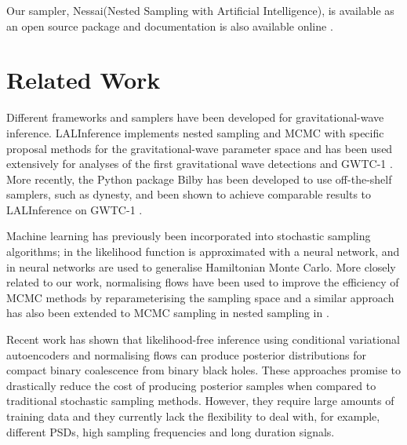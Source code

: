 \documentclass[%
 reprint,
nofootinbib,
 amsmath,amssymb,
 aps,
 prd,
]{revtex4-2}
\newcommand{\nessai}{{\sc Nessai}\xspace}
\newcommand{\bilby}{{\sc Bilby}\xspace}
\newcommand{\lalinference}{{\sc LALInference}\xspace}
\newcommand{\dynesty}{{\sc dynesty}\xspace}
\newcommand{\python}{{\sc Python}\xspace}
\begin{document}
Our sampler, \nessai (Nested Sampling with Artificial Intelligence), is available as an open source package \cite{nessai-git} and documentation is also available online \cite{nessai-docs}.


\section{Related Work} \label{sec:related_work}

Different frameworks and samplers have been developed for gravitational-wave inference. \lalinference \cite{Veitch:2015} implements nested sampling and \ac{MCMC} with specific proposal methods for the gravitational-wave parameter space and has been used extensively for analyses of the first gravitational wave detections \cite{Abbott:2016blz} and GWTC-1 \cite{LIGOScientific:2018mvr}. More recently, the \python package \bilby \cite{Ashton:2019} has been developed to use off-the-shelf samplers, such as \dynesty \cite{Speagle:2020}, and been shown to achieve comparable results to \lalinference on GWTC-1 \cite{Romero-Shaw:2020}.

Machine learning has previously been incorporated into stochastic sampling algorithms; in \cite{Graff:2013bambi} the likelihood function is approximated with a neural network, and in \cite{Levy:2017ghmc} neural networks are used to generalise Hamiltonian Monte Carlo. More closely related to our work, normalising flows have been used to improve the efficiency of \ac{MCMC} methods by reparameterising the sampling space \cite{Hoffman:2019} and a similar approach has also been extended to \ac{MCMC} sampling in nested sampling in \cite{Moss:2019}.

Recent work has shown that likelihood-free inference using conditional variational autoencoders \cite{Gabbard:2019, Chua:2019} and normalising flows \cite{Green:2020a, Green:2020complete} can produce posterior distributions for compact binary coalescence from binary black holes. These approaches promise to drastically reduce the cost of producing posterior samples when compared to traditional stochastic sampling methods. However, they require large amounts of training data and they currently lack the flexibility to deal with, for example, different PSDs, high sampling frequencies and long duration signals.
\end{document}
